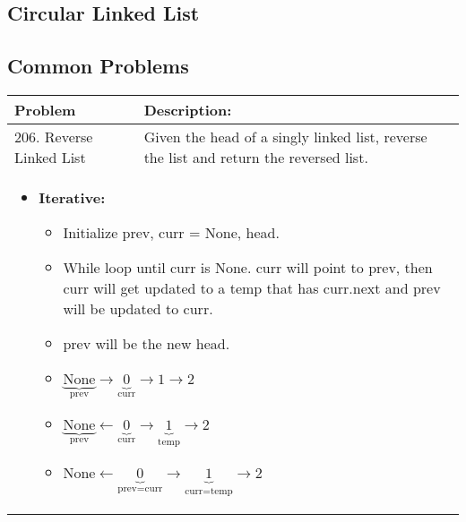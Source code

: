 \subsection{Circular Linked List}
\begin{algo}

\end{algo}

\subsection{Common Problems}
\begin{summary}
    \begin{center}
        \begin{tabular}{ll}
            \toprule
            \textbf{Problem} & \textbf{Description:} \\
            \midrule
                206. Reverse Linked List & Given the head of a singly linked list, reverse the list and return the reversed list. \\
                \multicolumn{2}{p{\linewidth}}{
                    \begin{itemize}
                        \item \textbf{Iterative:} 
                        \begin{itemize}
                            \item Initialize prev, curr = None, head. 
                            \item While loop until curr is None. curr will point to prev, then curr will get updated to a temp that has curr.next and prev will be updated to curr.
                            \item prev will be the new head. 
                            \item $\underbrace{\text{None}}_{\text{prev}}\rightarrow\underbrace{0}_{\text{curr}}\rightarrow1\rightarrow2$
                            \item $\underbrace{\text{None}}_{\text{prev}}\leftarrow\underbrace{0}_{\text{curr}}\rightarrow\underbrace{1}_{\text{temp}}\rightarrow2$
                            \item $\text{None}\leftarrow\underbrace{0}_{\text{prev=curr}}\rightarrow\underbrace{1}_{\text{curr=temp}}\rightarrow2$
                        \end{itemize}
                    \end{itemize}
                } \\
            \bottomrule
        \end{tabular}
    \end{center}
\end{summary}

